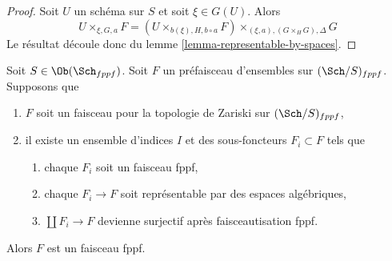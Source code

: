 \begin{proof}
Soit $U$ un schéma sur $S$ et soit $\xi \in G(U)$. Alors
$$
U \times_{\xi, G, a} F =
(U \times_{b(\xi), H, b \circ a} F) \times_{(\xi, a), (G \times_H G), \Delta} G
$$
Le résultat découle donc du lemme \ref{lemma-representable-by-spaces}.
\end{proof}

\begin{lemma}
\label{lemma-glueing-sheaves}
Soit $S \in \Ob(\Sch_{fppf})$. Soit $F$ un préfaisceau d'ensembles sur
$(\Sch/S)_{fppf}$. Supposons que
\begin{enumerate}
\item $F$ soit un faisceau pour la topologie de Zariski sur $(\Sch/S)_{fppf}$,
\item il existe un ensemble d'indices $I$ et des sous-foncteurs $F_i \subset F$ tels que
\begin{enumerate}
\item chaque $F_i$ soit un faisceau fppf,
\item chaque $F_i \to F$ soit représentable par des espaces algébriques,
\item $\coprod F_i \to F$ devienne surjectif après faisceautisation fppf.
\end{enumerate}
\end{enumerate}
Alors $F$ est un faisceau fppf.
\end{lemma}

